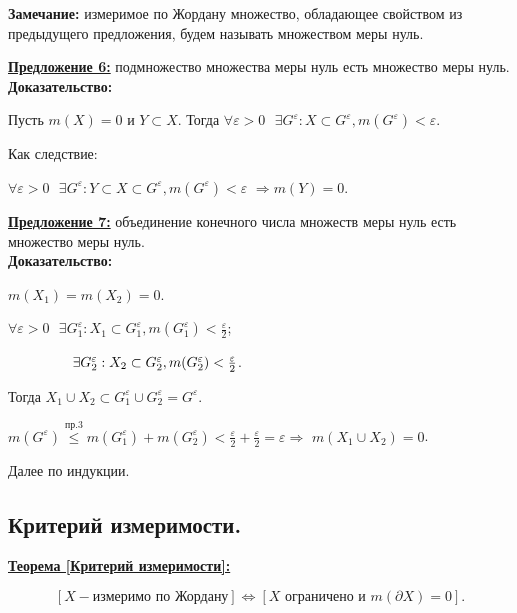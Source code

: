 \documentclass[a4paper,12pt]{article} %
\begin{document}
	\textbf{Замечание:} измеримое по Жордану множество, обладающее свойством из предыдущего предложения, будем называть множеством меры нуль.
	
	\vspace{3mm}
	
	\underline{\textbf{Предложение 6:}} подмножество множества меры нуль есть множество меры нуль.\\
	
	\textbf{Доказательство:}
	
	Пусть $m(X) = 0$ и $Y \subset X$. Тогда $\forall \varepsilon > 0 \text{ }\exists G^{\varepsilon}: X \subset G^{\varepsilon}, m(G^{\varepsilon}) < \varepsilon$.
	
	Как следствие:
	
	$\forall \varepsilon > 0 \text{ }\exists G^{\varepsilon}: Y\subset X \subset G^{\varepsilon}, m(G^{\varepsilon}) < \varepsilon$ $\Rightarrow m(Y) = 0$.
	
	\vspace{3mm}
	
	\underline{\textbf{Предложение 7:}} объединение конечного числа множеств меры нуль есть множество меры нуль.\\
	
	\textbf{Доказательство:}
	
	$m(X_1) = m(X_2) = 0$.
	
	$\forall \varepsilon > 0 \text{ }\exists G_1^{\varepsilon}: X_1 \subset G_1^{\varepsilon}, m(G_1^{\varepsilon}) < \frac{\varepsilon}{2}$;
	
	$\hspace{16mm}\exists G_2^{\varepsilon}: X_2 \subset G_2^{\varepsilon}, m(G_2^{\varepsilon}) < \frac{\varepsilon}{2}$.
	
	Тогда $X_1 \cup X_2 \subset G_1^{\varepsilon} \cup G_2^{\varepsilon} = G^{\varepsilon}$.
	
	$m(G^{\varepsilon}) \stackrel{\text{пр.3}}{\leqslant} m(G_1^{\varepsilon}) + m(G_2^{\varepsilon}) < \frac{\varepsilon}{2} + \frac{\varepsilon}{2} = \varepsilon \Rightarrow$ $m(X_1 \cup X_2) = 0$.
	
	Далее по индукции.\\
	
	\subsection{Критерий измеримости.}
	
	\underline{\textbf{Теорема [Критерий измеримости]:}}
	
	\begin{equation*}
		\left[X - \text{измеримо по Жордану}\right] \Longleftrightarrow \left[ X \text{ ограничено и } m(\partial X) = 0\right].
	\end{equation*}	
	
\end{document}
